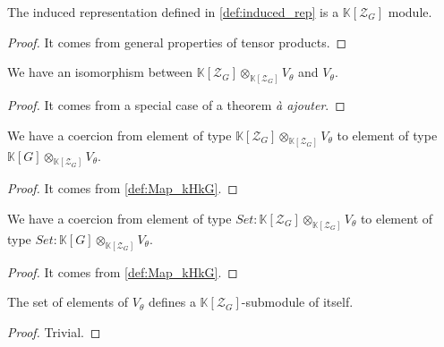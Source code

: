 \begin{proposition}
    \label{prop:induced_rep_is_module}
    \leanok 
   The induced representation defined in \ref{def:induced_rep} is a $\mathbb{K}[\mathcal{Z}_G]$ module.
\end{proposition}
\begin{proof}
    \leanok
    It comes from general properties of tensor products.
\end{proof}


\begin{proposition}
    \label{prop:module_sub_rep_iso}
    \leanok
    We have an isomorphism between $\mathbb{K}[\mathcal{Z}_G]\otimes_{\mathbb{K}[\mathcal{Z}_G]}V_\theta$ and $V_\theta$.
\end{proposition}
\begin{proof}
    \leanok
    It comes from a special case of a theorem \textit{à ajouter}.
\end{proof}

\begin{proposition}[Coercion]
    \label{prop:induced_rep_coe}
    \leanok 
   We have a coercion from element of type $\mathbb{K}[\mathcal{Z}_G]\otimes_{\mathbb{K}[\mathcal{Z}_G]}V_\theta$
   to element of type $\mathbb{K}[G]\otimes_{\mathbb{K}[\mathcal{Z}_G]}V_\theta$.
\end{proposition}
\begin{proof}
    \leanok
    It comes from \ref{def:Map_kHkG}.
\end{proof}

\begin{proposition}
    \label{prop:induced_rep_coe_set}
    \leanok 
   We have a coercion from element of type $Set : \mathbb{K}[\mathcal{Z}_G]\otimes_{\mathbb{K}[\mathcal{Z}_G]}V_\theta$
   to element of type $Set : \mathbb{K}[G]\otimes_{\mathbb{K}[\mathcal{Z}_G]}V_\theta$.
\end{proposition}
\begin{proof}
    \leanok
    It comes from \ref{def:Map_kHkG}.
\end{proof}


\begin{proposition}
    \label{prop:theta_submodule}
    \uses{}
    \leanok 
    The set of elements of $V_\theta$ defines a $\mathbb{K}[\mathcal{Z}_G]$-submodule of itself.
\end{proposition}
\begin{proof}
    \leanok
    Trivial.
\end{proof}

